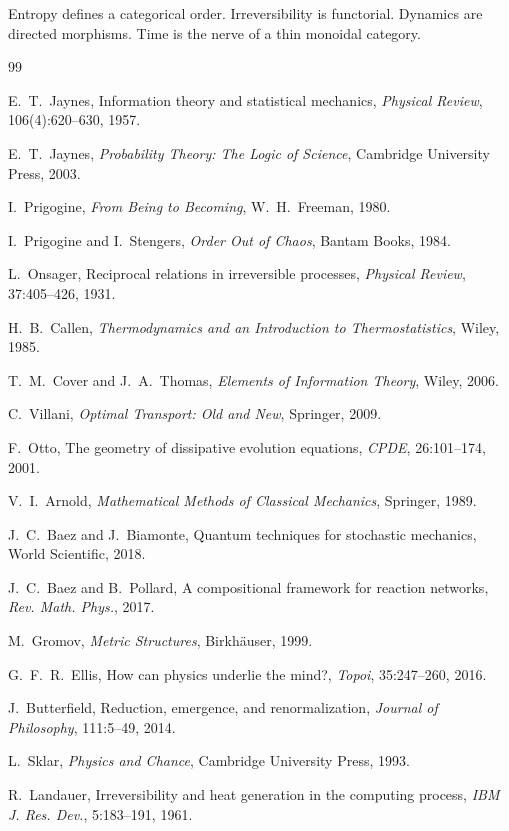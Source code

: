 \documentclass[11pt]{article}
\begin{document}
Entropy defines a categorical order.
Irreversibility is functorial.
Dynamics are directed morphisms.
Time is the nerve of a thin monoidal category.


\begin{thebibliography}{99}

E.~T.~Jaynes,
Information theory and statistical mechanics,
\emph{Physical Review}, 106(4):620--630, 1957.

E.~T.~Jaynes,
\emph{Probability Theory: The Logic of Science},
Cambridge University Press, 2003.

I.~Prigogine,
\emph{From Being to Becoming},
W.~H.~Freeman, 1980.

I.~Prigogine and I.~Stengers,
\emph{Order Out of Chaos},
Bantam Books, 1984.

L.~Onsager,
Reciprocal relations in irreversible processes,
\emph{Physical Review}, 37:405--426, 1931.

H.~B.~Callen,
\emph{Thermodynamics and an Introduction to Thermostatistics},
Wiley, 1985.

T.~M.~Cover and J.~A.~Thomas,
\emph{Elements of Information Theory},
Wiley, 2006.

C.~Villani,
\emph{Optimal Transport: Old and New},
Springer, 2009.

F.~Otto,
The geometry of dissipative evolution equations,
\emph{CPDE}, 26:101--174, 2001.

V.~I.~Arnold,
\emph{Mathematical Methods of Classical Mechanics},
Springer, 1989.

J.~C.~Baez and J.~Biamonte,
Quantum techniques for stochastic mechanics,
World Scientific, 2018.

J.~C.~Baez and B.~Pollard,
A compositional framework for reaction networks,
\emph{Rev. Math. Phys.}, 2017.

M.~Gromov,
\emph{Metric Structures},
Birkhäuser, 1999.

G.~F.~R.~Ellis,
How can physics underlie the mind?,
\emph{Topoi}, 35:247--260, 2016.

J.~Butterfield,
Reduction, emergence, and renormalization,
\emph{Journal of Philosophy}, 111:5--49, 2014.

L.~Sklar,
\emph{Physics and Chance},
Cambridge University Press, 1993.

R.~Landauer,
Irreversibility and heat generation in the computing process,
\emph{IBM J. Res. Dev.}, 5:183--191, 1961.

\end{thebibliography}
\end{document}
